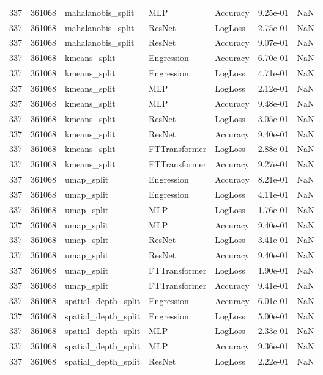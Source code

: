 \begin{tabular}{rrlllrr}
337 & 361068 & mahalanobis\_split & MLP & Accuracy & 9.25e-01 & NaN \\
337 & 361068 & mahalanobis\_split & ResNet & LogLoss & 2.75e-01 & NaN \\
337 & 361068 & mahalanobis\_split & ResNet & Accuracy & 9.07e-01 & NaN \\
337 & 361068 & kmeans\_split & Engression & Accuracy & 6.70e-01 & NaN \\
337 & 361068 & kmeans\_split & Engression & LogLoss & 4.71e-01 & NaN \\
337 & 361068 & kmeans\_split & MLP & LogLoss & 2.12e-01 & NaN \\
337 & 361068 & kmeans\_split & MLP & Accuracy & 9.48e-01 & NaN \\
337 & 361068 & kmeans\_split & ResNet & LogLoss & 3.05e-01 & NaN \\
337 & 361068 & kmeans\_split & ResNet & Accuracy & 9.40e-01 & NaN \\
337 & 361068 & kmeans\_split & FTTransformer & LogLoss & 2.88e-01 & NaN \\
337 & 361068 & kmeans\_split & FTTransformer & Accuracy & 9.27e-01 & NaN \\
337 & 361068 & umap\_split & Engression & Accuracy & 8.21e-01 & NaN \\
337 & 361068 & umap\_split & Engression & LogLoss & 4.11e-01 & NaN \\
337 & 361068 & umap\_split & MLP & LogLoss & 1.76e-01 & NaN \\
337 & 361068 & umap\_split & MLP & Accuracy & 9.40e-01 & NaN \\
337 & 361068 & umap\_split & ResNet & LogLoss & 3.41e-01 & NaN \\
337 & 361068 & umap\_split & ResNet & Accuracy & 9.40e-01 & NaN \\
337 & 361068 & umap\_split & FTTransformer & LogLoss & 1.90e-01 & NaN \\
337 & 361068 & umap\_split & FTTransformer & Accuracy & 9.41e-01 & NaN \\
337 & 361068 & spatial\_depth\_split & Engression & Accuracy & 6.01e-01 & NaN \\
337 & 361068 & spatial\_depth\_split & Engression & LogLoss & 5.00e-01 & NaN \\
337 & 361068 & spatial\_depth\_split & MLP & LogLoss & 2.33e-01 & NaN \\
337 & 361068 & spatial\_depth\_split & MLP & Accuracy & 9.36e-01 & NaN \\
337 & 361068 & spatial\_depth\_split & ResNet & LogLoss & 2.22e-01 & NaN \\

\end{tabular}
